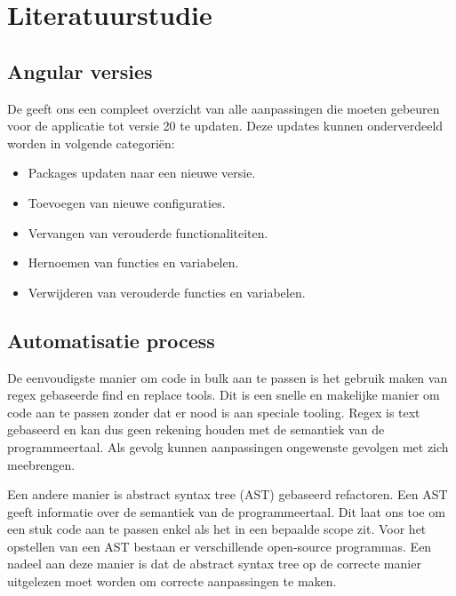 \section{Literatuurstudie}
\label{sec:literatuurstudie}

\subsection{Angular versies}
\label{sec:angular versies}

De \textcite{Angular update guide} geeft ons een compleet overzicht van alle aanpassingen die moeten gebeuren voor de applicatie tot versie 20 te updaten. Deze updates kunnen onderverdeeld worden in volgende categoriën:

\begin{itemize}
  \item Packages updaten naar een nieuwe versie.
  \item Toevoegen van nieuwe configuraties.
  \item Vervangen van verouderde functionaliteiten. 
  \item Hernoemen van functies en variabelen.
  \item Verwijderen van verouderde functies en variabelen.
\end{itemize}


\subsection{Automatisatie process}
\label{sec:automatisatie_process}

De eenvoudigste manier om code in bulk aan te passen is het gebruik maken van regex gebaseerde find en replace tools.
Dit is een snelle en makelijke manier om code aan te passen zonder dat er nood is aan speciale tooling.
Regex is text gebaseerd en kan dus geen rekening houden met de semantiek van de programmeertaal.
Als gevolg kunnen aanpassingen ongewenste gevolgen met zich meebrengen.

Een andere manier is abstract syntax tree (AST) gebaseerd refactoren.
Een AST geeft informatie over de semantiek van de programmeertaal.
Dit laat ons toe om een stuk code aan te passen enkel als het in een bepaalde scope zit.
Voor het opstellen van een AST bestaan er verschillende open-source programmas.
Een nadeel aan deze manier is dat de abstract syntax tree op de correcte manier uitgelezen moet worden om correcte aanpassingen te maken.

